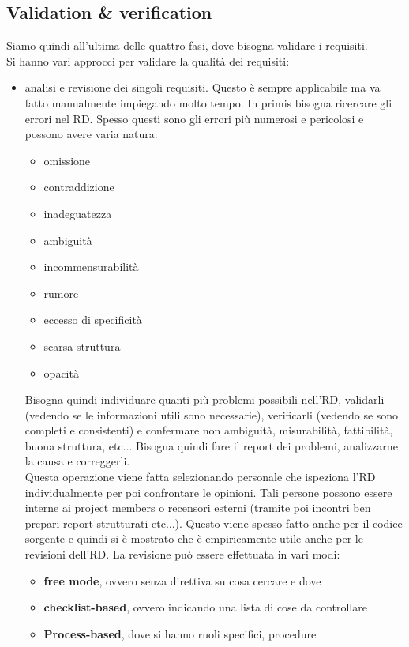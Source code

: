 \documentclass[a4paper,12pt, oneside]{book}
\begin{document}
\subsection{Validation \& verification}
Siamo quindi all'ultima delle quattro fasi, dove bisogna validare i requisiti.\\
Si hanno vari approcci per validare la qualità dei requisiti:
\begin{itemize}
  \item analisi e revisione dei singoli requisiti. Questo è sempre applicabile
  ma va fatto manualmente impiegando molto tempo.
  In primis bisogna ricercare gli errori nel RD. Spesso questi sono gli errori
  più numerosi e pericolosi e possono avere varia natura:
  \begin{itemize}
    \item omissione
    \item contraddizione
    \item inadeguatezza
    \item ambiguità
    \item incommensurabilità
    \item rumore
    \item eccesso di specificità
    \item scarsa struttura
    \item opacità
  \end{itemize}
  Bisogna quindi individuare quanti più problemi possibili nell'RD, validarli
  (vedendo se le informazioni utili sono necessarie), verificarli (vedendo se
  sono completi e consistenti) e confermare non ambiguità, misurabilità,
  fattibilità, buona struttura, etc$\ldots$ Bisogna quindi fare il report dei
  problemi, analizzarne la causa e correggerli.\\
  Questa operazione viene fatta
  selezionando personale che ispeziona l'RD individualmente per poi confrontare
  le opinioni. Tali persone possono essere interne ai project members o
  recensori esterni (tramite poi incontri ben prepari report strutturati
  etc$\ldots$). Questo viene spesso fatto anche per il codice sorgente e quindi
  si è mostrato che è empiricamente utile anche per le revisioni dell'RD. La
  revisione può essere effettuata in vari modi:
  \begin{itemize}
    \item \textbf{free mode}, ovvero senza direttiva su cosa cercare e dove
    \item \textbf{checklist-based}, ovvero indicando una lista di cose da
    controllare
    \item \textbf{Process-based}, dove si hanno ruoli specifici, procedure

\end{itemize}
\end{itemize}
\end{document}
